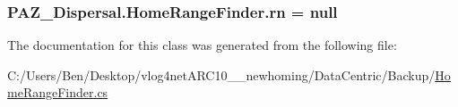 \hypertarget{class_p_a_z___dispersal_1_1_home_range_finder_a470c3b4e986e4ba1bcb188215a71d65a}{
\subsubsection[{rn}]{ P\-A\-Z\-\_\-\-Dispersal.\-Home\-Range\-Finder.\-rn = null\hspace{0.3cm}{\ttfamily [protected]}}}\label{class_p_a_z___dispersal_1_1_home_range_finder_a470c3b4e986e4ba1bcb188215a71d65a}


The documentation for this class was generated from the following file\-:\begin{DoxyCompactItemize}
\item 
C\-:/\-Users/\-Ben/\-Desktop/vlog4net\-A\-R\-C10\-\_\-\_\-newhoming/\-Data\-Centric/\-Backup/\hyperlink{_backup_2_home_range_finder_8cs}{Home\-Range\-Finder.\-cs}\end{DoxyCompactItemize}
